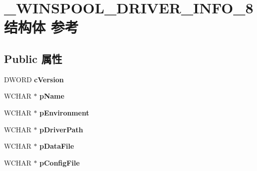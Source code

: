\hypertarget{struct___w_i_n_s_p_o_o_l___d_r_i_v_e_r___i_n_f_o__8}{}\section{\+\_\+\+W\+I\+N\+S\+P\+O\+O\+L\+\_\+\+D\+R\+I\+V\+E\+R\+\_\+\+I\+N\+F\+O\+\_\+8结构体 参考}
\label{struct___w_i_n_s_p_o_o_l___d_r_i_v_e_r___i_n_f_o__8}
\subsection*{Public 属性}
\begin{DoxyCompactItemize}
\item 
\mbox{\label{struct___w_i_n_s_p_o_o_l___d_r_i_v_e_r___i_n_f_o__8_ad876b69277fbf851ac6f961d1d7d9d79}} 
D\+W\+O\+RD {\bfseries c\+Version}
\item 
\mbox{\label{struct___w_i_n_s_p_o_o_l___d_r_i_v_e_r___i_n_f_o__8_a1133daac19ec1b91cff8749559d37f45}} 
W\+C\+H\+AR $\ast$ {\bfseries p\+Name}
\item 
\mbox{\label{struct___w_i_n_s_p_o_o_l___d_r_i_v_e_r___i_n_f_o__8_a913b0529f145f675ef53b1bbcfc23573}} 
W\+C\+H\+AR $\ast$ {\bfseries p\+Environment}
\item 
\mbox{\label{struct___w_i_n_s_p_o_o_l___d_r_i_v_e_r___i_n_f_o__8_a4a936bc7604ef55f9797cad0a869b84a}} 
W\+C\+H\+AR $\ast$ {\bfseries p\+Driver\+Path}
\item 
\mbox{\label{struct___w_i_n_s_p_o_o_l___d_r_i_v_e_r___i_n_f_o__8_ae9f12a07efe529d8251cac53d24f0c5b}} 
W\+C\+H\+AR $\ast$ {\bfseries p\+Data\+File}
\item 
\mbox{\label{struct___w_i_n_s_p_o_o_l___d_r_i_v_e_r___i_n_f_o__8_a6259b33abb2421b0d287793e7d32d26f}} 
W\+C\+H\+AR $\ast$ {\bfseries p\+Config\+File}
\item 

\end{DoxyCompactItemize}
